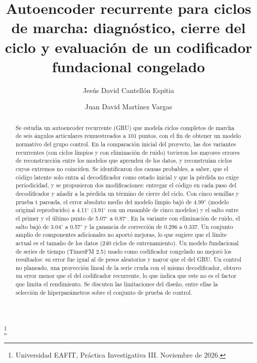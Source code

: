 \documentclass[11pt,a4paper]{amsart}
\newcommand{\gr}{$^{\circ}$}
\begin{document}
\title[Autoencoder recurrente de ciclos de marcha]{Autoencoder recurrente para ciclos de marcha: diagn\'ostico, cierre del ciclo y evaluaci\'on de un codificador fundacional congelado}

\author{Jes\'us David Cantell\'on Espitia}
\thanks{Universidad EAFIT, Pr\'actica Investigativa III. Noviembre de 2026.}
\author{Juan David Mart\'inez Vargas}

\begin{abstract}
Se estudia un autoencoder recurrente (GRU) que modela ciclos completos de marcha de seis ángulos articulares remuestreados a 101 puntos, con el fin de obtener un modelo normativo del grupo control. En la comparación inicial del proyecto, las dos variantes recurrentes (con ciclos limpios y con eliminación de ruido) tuvieron los mayores errores de reconstrucción entre los modelos que aprenden de los datos, y reconstruían ciclos cuyos extremos no coinciden. Se identificaron dos causas probables, a saber, que el código latente solo entra al decodificador como estado inicial y que la pérdida no exige periodicidad, y se propusieron dos modificaciones: entregar el código en cada paso del decodificador y añadir a la pérdida un término de cierre del ciclo. Con cinco semillas y prueba t pareada, el error absoluto medio del modelo limpio bajó de 4.99\gr{} (modelo original reproducido) a 4.11\gr{} (3.91\gr{} con un ensamble de cinco modelos) y el salto entre el primer y el último punto de 5.07\gr{} a 0.87\gr{}. En la variante con eliminación de ruido, el salto bajó de 3.04\gr{} a 0.57\gr{} y la ganancia de corrección de 0.296 a 0.337. Un conjunto amplio de componentes adicionales no aportó mejoras, lo que sugiere que el límite actual es el tamaño de los datos (240 ciclos de entrenamiento). Un modelo fundacional de series de tiempo (TimesFM 2.5) usado como codificador congelado no mejoró los resultados: su error fue igual al de pesos aleatorios y mayor que el del GRU. Un control no planeado, una proyección lineal de la serie cruda con el mismo decodificador, obtuvo un error menor que el del codificador recurrente, lo que indica que este no es el factor que limita el rendimiento. Se discuten las limitaciones del diseño, entre ellas la selección de hiperparámetros sobre el conjunto de prueba de control.
\end{abstract}

\maketitle
\end{document}
